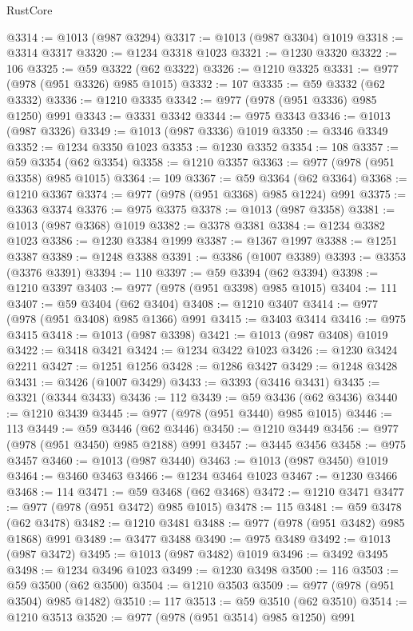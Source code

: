 \begin{lexlean}{RustCore}
\begin{coremodule}
@3314 := @1013 (@987 @3294)
@3317 := @1013 (@987 @3304) @1019
@3318 := @3314 @3317
@3320 := @1234 @3318 @1023
@3321 := @1230 @3320
@3322 := 106
@3325 := @59 @3322 (@62 @3322)
@3326 := @1210 @3325
@3331 := @977 (@978 (@951 @3326) @985 @1015)
@3332 := 107
@3335 := @59 @3332 (@62 @3332)
@3336 := @1210 @3335
@3342 := @977 (@978 (@951 @3336) @985 @1250) @991
@3343 := @3331 @3342
@3344 := @975 @3343
@3346 := @1013 (@987 @3326)
@3349 := @1013 (@987 @3336) @1019
@3350 := @3346 @3349
@3352 := @1234 @3350 @1023
@3353 := @1230 @3352
@3354 := 108
@3357 := @59 @3354 (@62 @3354)
@3358 := @1210 @3357
@3363 := @977 (@978 (@951 @3358) @985 @1015)
@3364 := 109
@3367 := @59 @3364 (@62 @3364)
@3368 := @1210 @3367
@3374 := @977 (@978 (@951 @3368) @985 @1224) @991
@3375 := @3363 @3374
@3376 := @975 @3375
@3378 := @1013 (@987 @3358)
@3381 := @1013 (@987 @3368) @1019
@3382 := @3378 @3381
@3384 := @1234 @3382 @1023
@3386 := @1230 @3384 @1999
@3387 := @1367 @1997
@3388 := @1251 @3387
@3389 := @1248 @3388
@3391 := @3386 (@1007 @3389)
@3393 := @3353 (@3376 @3391)
@3394 := 110
@3397 := @59 @3394 (@62 @3394)
@3398 := @1210 @3397
@3403 := @977 (@978 (@951 @3398) @985 @1015)
@3404 := 111
@3407 := @59 @3404 (@62 @3404)
@3408 := @1210 @3407
@3414 := @977 (@978 (@951 @3408) @985 @1366) @991
@3415 := @3403 @3414
@3416 := @975 @3415
@3418 := @1013 (@987 @3398)
@3421 := @1013 (@987 @3408) @1019
@3422 := @3418 @3421
@3424 := @1234 @3422 @1023
@3426 := @1230 @3424 @2211
@3427 := @1251 @1256
@3428 := @1286 @3427
@3429 := @1248 @3428
@3431 := @3426 (@1007 @3429)
@3433 := @3393 (@3416 @3431)
@3435 := @3321 (@3344 @3433)
@3436 := 112
@3439 := @59 @3436 (@62 @3436)
@3440 := @1210 @3439
@3445 := @977 (@978 (@951 @3440) @985 @1015)
@3446 := 113
@3449 := @59 @3446 (@62 @3446)
@3450 := @1210 @3449
@3456 := @977 (@978 (@951 @3450) @985 @2188) @991
@3457 := @3445 @3456
@3458 := @975 @3457
@3460 := @1013 (@987 @3440)
@3463 := @1013 (@987 @3450) @1019
@3464 := @3460 @3463
@3466 := @1234 @3464 @1023
@3467 := @1230 @3466
@3468 := 114
@3471 := @59 @3468 (@62 @3468)
@3472 := @1210 @3471
@3477 := @977 (@978 (@951 @3472) @985 @1015)
@3478 := 115
@3481 := @59 @3478 (@62 @3478)
@3482 := @1210 @3481
@3488 := @977 (@978 (@951 @3482) @985 @1868) @991
@3489 := @3477 @3488
@3490 := @975 @3489
@3492 := @1013 (@987 @3472)
@3495 := @1013 (@987 @3482) @1019
@3496 := @3492 @3495
@3498 := @1234 @3496 @1023
@3499 := @1230 @3498
@3500 := 116
@3503 := @59 @3500 (@62 @3500)
@3504 := @1210 @3503
@3509 := @977 (@978 (@951 @3504) @985 @1482)
@3510 := 117
@3513 := @59 @3510 (@62 @3510)
@3514 := @1210 @3513
@3520 := @977 (@978 (@951 @3514) @985 @1250) @991

\end{coremodule}
\end{lexlean}

